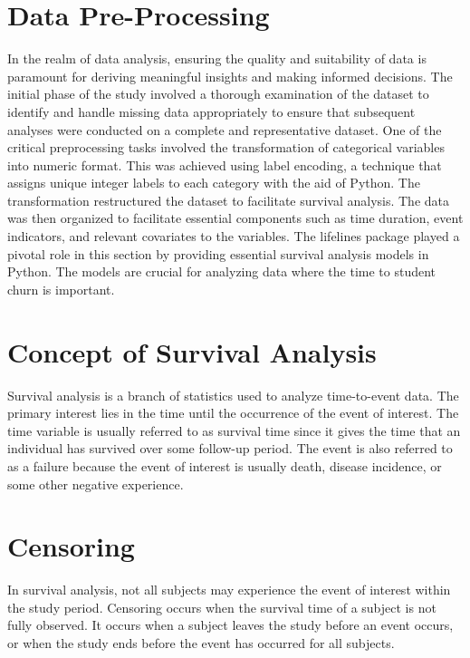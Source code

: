\documentclass[doublespacing]{report} %
\begin{document}
\section{Data Pre-Processing}

In the realm of data analysis, ensuring the quality and suitability of data is paramount for deriving meaningful insights and making informed decisions. The initial phase of the study involved a thorough examination of the dataset to identify and handle missing data appropriately to ensure that subsequent analyses were conducted on a complete and representative dataset. One of the critical preprocessing tasks involved the transformation of categorical variables into numeric format. This was achieved using label encoding, a technique that assigns unique integer labels to each category with the aid of Python. The transformation restructured the dataset to facilitate survival analysis. The data was then organized to facilitate essential components such as time duration, event indicators, and relevant covariates to the variables. 
The lifelines package played a pivotal role in this section by providing essential survival analysis models in Python. The models are crucial for analyzing data where the time to student churn is important. 

\section{Concept of Survival Analysis}

Survival analysis is a branch of statistics used to analyze time-to-event data. The primary interest lies in the time until the occurrence of the event of interest.  The time variable is usually referred to as survival time since it gives the time that an individual has survived over some follow-up period. The event is also referred to as a failure because the event of interest is usually death, disease incidence, or some other negative experience. 

\section{Censoring}

In survival analysis, not all subjects may experience the event of interest within the study period. Censoring occurs when the survival time of a subject is not fully observed. It occurs when a subject leaves the study before an event occurs, or when the study ends before the event has occurred for all subjects.
\end{document}
